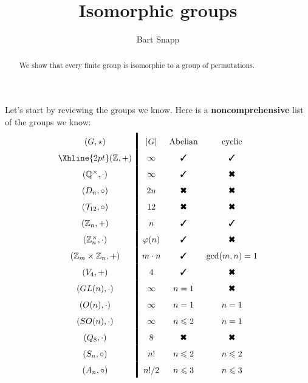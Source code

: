 \documentclass{ximera}
\author{Bart Snapp}
\title{Isomorphic groups}
\begin{document}
\begin{abstract}
  We show that every finite group is isomorphic to a group of
  permutations.
\end{abstract}
\maketitle

Let's start by reviewing the groups we know. Here is a
\textbf{noncomprehensive} list of the groups we know:
\[
\renewcommand{\arraystretch}{1.6}
\begin{array}{c!{\vline width 2pt}cccccc}
  (G,\star)                & |G|           & \text{Abelian}        & \text{cyclic}        \\  \Xhline{2pt}
  (\Z,+)                   & \infty        & \text{\ding{51}}      & \text{\ding{51}}     \\
  (\Q^\times,\cdot)        & \infty        & \text{\ding{51}}      & \text{\ding{54}}     \\
  (D_n,\circ)              & 2n            & \text{\ding{54}}      & \text{\ding{54}}     \\
  (\mathcal{T}_{12},\circ) & 12            & \text{\ding{54}}      & \text{\ding{54}}     \\
  (\Z_n,+)                 & n             & \text{\ding{51}}      & \text{\ding{51}}     \\
  (\Z_n^\times,\cdot)      & \eulerphi(n)  & \text{\ding{51}}      & \text{\ding{54}}     \\    
  (\Z_m\times \Z_n,+)      & m\cdot n      & \text{\ding{51}}      & \gcd(m,n) = 1        \\
  (V_4,+)                  & 4             & \text{\ding{51}}      & \text{\ding{54}}     \\
  (GL(n),\cdot)            & \infty        & n = 1                 & \text{\ding{54}}     \\
  (O(n),\cdot)             & \infty        & n = 1                 & n=1                  \\
  (SO(n),\cdot)            & \infty        & n\le 2                & n=1                  \\
  (Q_8,\cdot)              & 8             & \text{\ding{54}}      & \text{\ding{54}}     \\
  (S_n,\circ)              & n!            & n\le 2                & n\le 2               \\
  (A_n,\circ)              & n!/2          & n\le 3                & n\le 3               \\
\end{array}
\]
\end{document}
